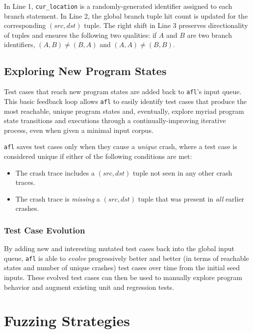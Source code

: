 In Line 1, \texttt{cur\_location} is a randomly-generated identifier
assigned to each branch statement. In Line 2, the global branch tuple hit count
is updated for the corresponding $(src, dst)$ tuple. The right shift in Line 3
preserves directionality of tuples and ensures the following two
qualities: if $A$ and $B$ are two branch identifiers, $(A, B) \neq (B, A)$ and
$(A, A) \neq (B, B)$.

\subsection{Exploring New Program States}

Test cases that reach new program states are added back to \texttt{afl}'s
input queue. This basic feedback loop allows \texttt{afl} to easily identify
test cases that produce the most reachable, unique program states and,
eventually, explore myriad program state transitions and executions through
a continually-improving iterative process, even when given a minimal input
corpus.

\texttt{afl} saves test cases only when they cause a \textit{unique} crash,
where a test case is considered unique if either of the following
conditions are met\cite{afl-whitepaper}:
\begin{itemize}
    \item The crash trace includes a $(src, dst)$ tuple not seen in any
    other crash traces.
    \item The crash trace is \textit{missing} a $(src, dst)$ tuple that was
    present in \textit{all} earlier crashes.
\end{itemize}

\subsubsection{Test Case Evolution}

By adding new and interesting mutated test cases back into the global input
queue, \texttt{afl} is able to \textit{evolve} progressively better and better
(in terms of reachable states and number of unique crashes) test cases
over time from the initial seed inputs. These evolved test cases can then be
used to manually explore program behavior and augment existing unit and
regression tests.

\section{Fuzzing Strategies}

